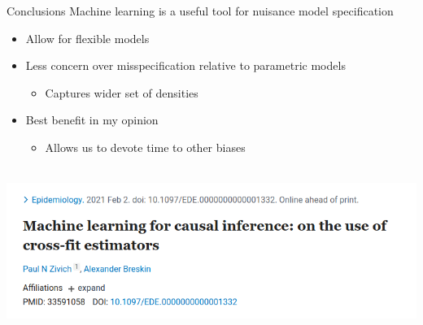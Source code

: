 \documentclass{beamer}
\begin{document}
\begin{frame}{Conclusions}
	Machine learning is a useful tool for nuisance model specification
	\begin{itemize}
		\item Allow for flexible models
		\item Less concern over misspecification relative to parametric models
		\begin{itemize}
			\item Captures wider set of densities
		\end{itemize}
		\item Best benefit in my opinion
		\begin{itemize}
			\item Allows us to devote time to other biases
		\end{itemize}
	\end{itemize}
\end{frame}

\begin{frame}{~ }
	\centering
	\includegraphics[scale=0.4]{images/paper_title.png}
\end{frame}
\end{document}
